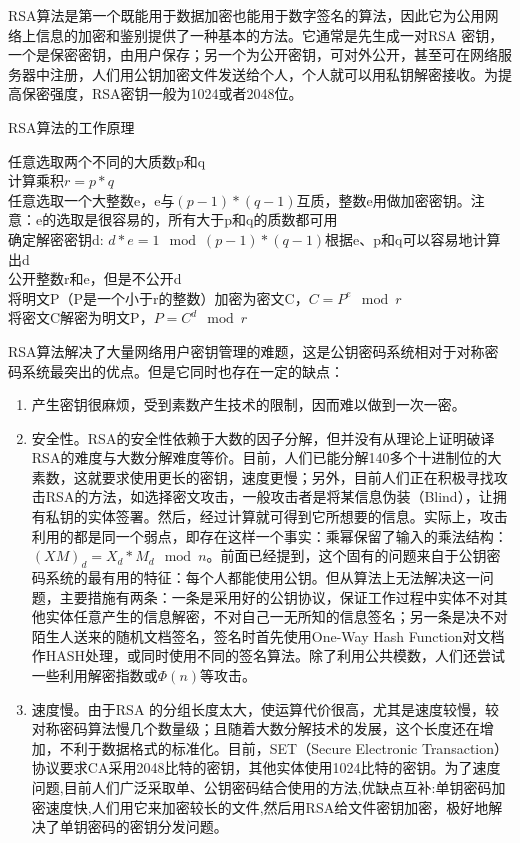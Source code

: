 \documentclass[UTF8,a4paper,10pt, twocolumn]{ctexart}
\begin{document}
RSA算法是第一个既能用于数据加密也能用于数字签名的算法，因此它为公用网络上信息的加密和鉴别提供了一种基本的方法。它通常是先生成一对RSA 密钥，一个是保密密钥，由用户保存；另一个为公开密钥，可对外公开，甚至可在网络服务器中注册，人们用公钥加密文件发送给个人，个人就可以用私钥解密接收。为提高保密强度，RSA密钥一般为1024或者2048位。

\begin{algorithm}
	\caption{RSA算法的工作原理}
	\begin{algorithmic}[1]
		\ENSURE 任意选取两个不同的大质数p和q\\           %
		
		\STATE 计算乘积$r=p*q$ \\  %
		\STATE 任意选取一个大整数e，e与$(p-1)*(q-1)$互质，整数e用做加密密钥。注意：e的选取是很容易的，所有大于p和q的质数都可用 \\
		\STATE 确定解密密钥d: $d * e = 1 \mod{(p - 1)*(q - 1)}$根据e、p和q可以容易地计算出d \\
		\STATE 公开整数r和e，但是不公开d \\
		\STATE 将明文P（P是一个小于r的整数）加密为密文C，$ C = P^e \mod r$ \\
		\STATE 将密文C解密为明文P，$P = C^d \mod r$

	\end{algorithmic}
\end{algorithm}

RSA算法解决了大量网络用户密钥管理的难题，这是公钥密码系统相对于对称密码系统最突出的优点。但是它同时也存在一定的缺点：
\begin{enumerate}
\item 产生密钥很麻烦，受到素数产生技术的限制，因而难以做到一次一密。
\item 安全性。RSA的安全性依赖于大数的因子分解，但并没有从理论上证明破译RSA的难度与大数分解难度等价。目前，人们已能分解140多个十进制位的大素数，这就要求使用更长的密钥，速度更慢；另外，目前人们正在积极寻找攻击RSA的方法，如选择密文攻击，一般攻击者是将某信息伪装（Blind），让拥有私钥的实体签署。然后，经过计算就可得到它所想要的信息。实际上，攻击利用的都是同一个弱点，即存在这样一个事实：乘幂保留了输入的乘法结构： $ (XM)_d = X_d *M_d \mod n$。前面已经提到，这个固有的问题来自于公钥密码系统的最有用的特征：每个人都能使用公钥。但从算法上无法解决这一问题，主要措施有两条：一条是采用好的公钥协议，保证工作过程中实体不对其他实体任意产生的信息解密，不对自己一无所知的信息签名；另一条是决不对陌生人送来的随机文档签名，签名时首先使用One-Way Hash Function对文档作HASH处理，或同时使用不同的签名算法。除了利用公共模数，人们还尝试一些利用解密指数或$\Phi (n)$等攻击。
\item 速度慢。由于RSA 的分组长度太大，使运算代价很高，尤其是速度较慢，较对称密码算法慢几个数量级；且随着大数分解技术的发展，这个长度还在增加，不利于数据格式的标准化。目前，SET（Secure Electronic Transaction）协议要求CA采用2048比特的密钥，其他实体使用1024比特的密钥。为了速度问题,目前人们广泛采取单、公钥密码结合使用的方法,优缺点互补:单钥密码加密速度快,人们用它来加密较长的文件,然后用RSA给文件密钥加密，极好地解决了单钥密码的密钥分发问题。
\end{enumerate}
\end{document}
